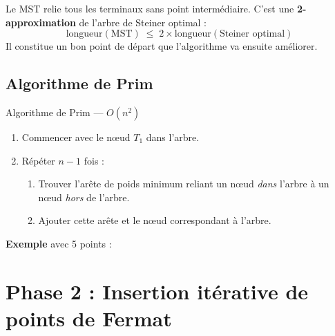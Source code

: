 \documentclass[12pt,a4paper]{article}
\begin{document}
Le MST relie tous les terminaux sans point intermédiaire.
C'est une \textbf{2-approximation} de l'arbre de Steiner optimal :
$$
  \text{longueur}(\text{MST}) \;\leq\; 2 \times \text{longueur}(\text{Steiner optimal})
$$
Il constitue un bon point de départ que l'algorithme va ensuite améliorer.

\subsection{Algorithme de Prim}

\begin{algbox}{Algorithme de Prim --- $O(n^2)$}
\begin{enumerate}
  \item Commencer avec le nœud $T_1$ dans l'arbre.
  \item Répéter $n-1$ fois :
    \begin{enumerate}
      \item Trouver l'arête de poids minimum reliant un nœud \emph{dans} l'arbre
            à un nœud \emph{hors} de l'arbre.
      \item Ajouter cette arête et le nœud correspondant à l'arbre.
    \end{enumerate}
\end{enumerate}
\end{algbox}

\medskip
\textbf{Exemple} avec 5 points :

\begin{center}
\end{center}

\section{Phase 2 : Insertion itérative de points de Fermat}
\end{document}
